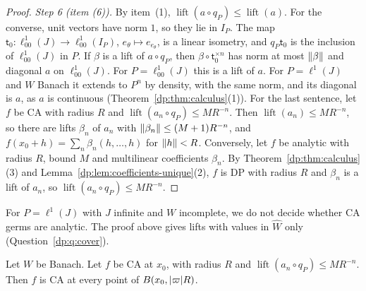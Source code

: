 \begin{proof}
\emph{Step 6 (item (6)).} By item~(1), $\operatorname{lift}(a\circ q_P)\le\operatorname{lift}(a)$. For the converse, unit vectors have norm $1$, so they lie in $I_P$. The map $\mathsf t_0\colon\ell^1_{00}(J)\to\ell^1_{00}(I_P)$, $e_\theta\mapsto e_{e_\theta}$, is a linear isometry, and $q_P\mathsf t_0$ is the inclusion of $\ell^1_{00}(J)$ in $P$. If $\beta$ is a lift of $a\circ q_P$, then $\beta\circ\mathsf t_0^{\times n}$ has norm at most $\lVert \beta\rVert$ and diagonal $a$ on $\ell^1_{00}(J)$. For $P=\ell^1_{00}(J)$ this is a lift of $a$. For $P=\ell^1(J)$ and $W$ Banach it extends to $P^n$ by density, with the same norm, and its diagonal is $a$, as $a$ is continuous (Theorem~\ref{dp:thm:calculus}(1)). For the last sentence, let $f$ be CA with radius $R$ and $\operatorname{lift}(a_n\circ q_P)\le MR^{-n}$. Then $\operatorname{lift}(a_n)\le MR^{-n}$, so there are lifts $\beta_n$ of $a_n$ with $\lVert \beta_n\rVert\le(M+1)R^{-n}$, and $f(x_0+h)=\sum_n\beta_n(h,\dots,h)$ for $\lVert h\rVert<R$. Conversely, let $f$ be analytic with radius $R$, bound $M$ and multilinear coefficients $\beta_n$. By Theorem~\ref{dp:thm:calculus}(3) and Lemma~\ref{dp:lem:coefficients-unique}(2), $f$ is DP with radius $R$ and $\beta_n$ is a lift of $a_n$, so $\operatorname{lift}(a_n\circ q_P)\le MR^{-n}$.
\end{proof}

For $P=\ell^1(J)$ with $J$ infinite and $W$ incomplete, we do not decide whether CA germs are analytic. The proof above gives lifts with values in $\widehat W$ only (Question~\ref{dp:q:cover}).

\begin{proposition}\label{dp:prop:ca-open}
Let $W$ be Banach. Let $f$ be CA at $x_0$, with radius $R$ and $\operatorname{lift}(a_n\circ q_P)\le MR^{-n}$. Then $f$ is CA at every point of $B(x_0,\lvert \varpi\rvert R)$.
\end{proposition}

